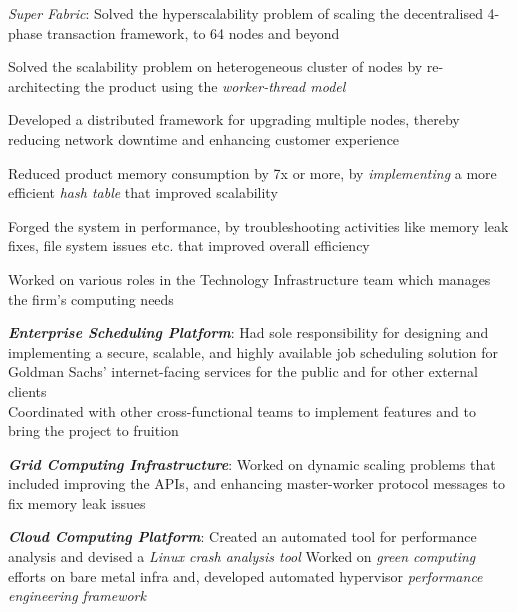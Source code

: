 \begin{minipage}[t]{0.68\textwidth}
\begin{tightitemize}
\item \textit{Super Fabric}: Solved the hyperscalability problem of scaling the decentralised 4-phase transaction framework, to 64 nodes and beyond
\item Solved the scalability problem on heterogeneous cluster of nodes by re-architecting the product using the \textit{worker-thread model}
\item Developed a distributed framework for upgrading multiple nodes, thereby reducing network downtime and enhancing customer experience
\item Reduced product memory consumption by 7x or more, by \textit{implementing} a more efficient \textit{hash table} that improved scalability
\item Forged the system in performance, by troubleshooting activities like memory leak fixes, file system issues etc. that improved overall efficiency
\end{tightitemize}

\sectionspace %


Worked on various roles in the Technology Infrastructure team which manages the firm’s computing needs
\\
\begin{tightitemize}
\item \textit{\textbf{Enterprise Scheduling Platform}}: Had sole responsibility for designing and implementing  a secure, scalable, and highly available job scheduling solution for Goldman Sachs’ internet-facing services for the public and for other external clients\\
\textbullet{} Coordinated with other cross-functional teams to implement features and to bring the project to fruition
\end{tightitemize}
\begin{tightitemize}
\item \textit{\textbf{Grid Computing Infrastructure}}: Worked on dynamic scaling problems that included improving the APIs, and enhancing master-worker protocol messages to fix memory leak issues
\end{tightitemize}
\begin{tightitemize}
\item \textit{\textbf{Cloud Computing Platform}}: Created an automated tool for performance analysis and devised a \textit{Linux crash analysis tool}
\textbullet{} Worked on \textit{green computing} efforts on bare metal infra and, developed automated hypervisor \textit{performance engineering framework}
\end{tightitemize}


\end{minipage}
